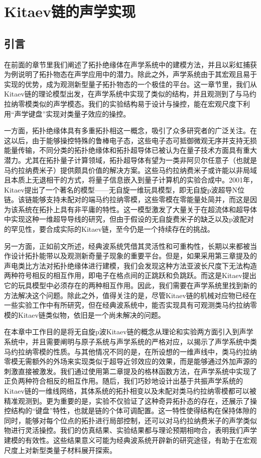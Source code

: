 \chapter{Kitaev链的声学实现}

\section{引言}

在前面的章节里我们阐述了拓扑绝缘体在声学系统中的建模方法，并且以彩虹捕获为例说明了拓扑物态在声学应用中的潜力。除此之外，声学系统由于其宏观且易于实现的优势，成为观测新型量子拓扑物态的一个极佳的平台。这一章节里，我们从Kitaev链的理论模型出发，在声学系统中实现了类似的结构，并且观测到了与马约拉纳零模类似的声学模态。我们的实验结构易于设计与操控，能在宏观尺度下利用“声学键盘”实现对类量子效应的操控。

一方面，拓扑绝缘体具有多重拓扑相这一概念，吸引了众多研究者的广泛关注。在这以后，由于能够操控特殊的鲁棒电子态，这些电子态可抵御微观无序并支持无损能量传输，不同分类的拓扑绝缘体和拓扑超导体已被认为在量子技术方面具有重大潜力。尤其在拓扑量子计算领域，拓扑超导体有望为一类非阿贝尔任意子（也就是马约拉纳费米子）提供颇具价值的解决方案。这些马约拉纳费米子或许能以非局域且本质上无退相干的方式，将量子信息嵌入到量子计算机的实验合成中\cite{r31,r32,r33}。2001年，Kitaev提出了一个著名的模型——无自旋一维玩具模型，即无自旋p波超导N位链。该链能够支持未配对的端马约拉纳零模，这些零模在零能量处简并，而这是因为该系统在拓扑上具有非平庸的特性\cite{r4}。这一模型激发了大量关于在超流体和超导体中实现这种一维超导导线的研究\cite{r51,r52,r53,r54,r55,r56,r57,r58,r59,r510}，但由于假设的无自旋费米子的缺乏以及p波配对的罕见性，要合成实际的Kitaev链，至今仍是一个持续存在的挑战。

另一方面，正如前文所述，经典波系统凭借其灵活性和可重构性，长期以来都被当作设计拓扑能带以及观测新奇量子现象的重要平台。但是，如果采用第三章提及的声电类比方法对拓扑绝缘体进行建模，我们会发现这种方法亚波长尺度下无法构造两种符号相反的相互作用，即电子在格点间的正跳跃和负跳跃。而这是Kitaev提出它的玩具模型中必须存在的两种相互作用。因此，我们需要在声学系统里找到新的方法解决这个问题。除此之外，值得关注的是，尽管Kitaev链的机械对应物已经在一些实验工作中有所研究\cite{C54}，但在经典波系统中，能否实现具有可观测类马约拉纳零模的Kitaev链类似物，依旧是一个尚未解决的问题。

在本章中工作目的是将无自旋p波Kitaev链的概念从理论和实验两方面引入到声学系统中，并且需要阐明与原子系统与声学系统的严格对应，以揭示了声学系统中类马约拉纳零模的性质。与其他情况不同的是，在所设想的一维声线中，类马约拉纳零模无需额外的外场来实现类似于超导近邻效应的效果，而是能够通过外加声源的刺激直接被激发。我们通过使用第二章提及的格林函数方法，在声学系统中实现了正负两种符合相反的相互作用。随后，我们巧妙地设计出基于共振声学系统的Kitaev链的一维线网络，其体系统的拓扑相变以及未配对类马约拉纳零模都可以被精准观测到。更为重要的是，实验不仅验证了这种奇异拓扑态的存在，还展示了操控结构的“键盘”特性，也就是链的个体可调配置。这一特性使得结构在保持体隙的同时，能够对每个位点的拓扑进行局部控制，还可以对马约拉纳费米子的声学类似物进行灵活操控。我们的仿真结果、实验结果都与理论预期相吻合，表明我们声学建模的有效性。这些结果意义可能为经典波系统开辟新的研究途径，有助于在宏观尺度上对新型类量子材料展开探索。

